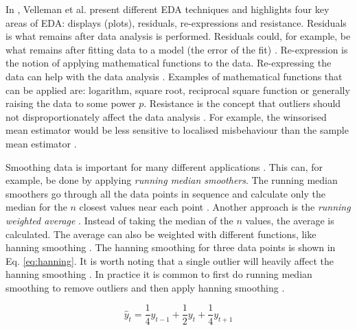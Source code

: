 In \cite{Velleman1981}, Velleman et al. present different EDA techniques and highlights four key areas of EDA: displays (plots), residuals, re-expressions and resistance.
Residuals is what remains after data analysis is performed.
Residuals could, for example, be what remains after fitting data to a model (the error of the fit) \cite{Velleman1981}.
Re-expression is the notion of applying mathematical functions to the data.
Re-expressing the data can help with the data analysis \cite{Hoaglin2003, Velleman1981}.
Examples of mathematical functions that can be applied are: logarithm, square root, reciprocal square function or generally raising the data to some power $p$.
Resistance is the concept that outliers should not disproportionately affect the data analysis \cite{Hoaglin2003, Velleman1981}.
For example, the winsorised mean estimator would be less sensitive to localised misbehaviour than the sample mean estimator \cite{Tukey1977}.

Smoothing data is important for many different applications \cite{Bradley1997, Pang2002, Quinlan1992, Velleman1981}.
This can, for example, be done by applying \emph{running median smoothers}.
The running median smoothers go through all the data points in sequence and calculate only the median for the $n$ closest values near each point \cite{Velleman1981}.
Another approach is the \emph{running weighted average} \cite{Velleman1981}.
Instead of taking the median of the $n$ values, the average is calculated.
The average can also be weighted with different functions, like hanning smoothing \cite{Velleman1981}.
The hanning smoothing for three data points is shown in Eq. \ref{eq:hanning}.
It is worth noting that a single outlier will heavily affect the hanning smoothing \cite{Velleman1981}.
In practice it is common to first do running median smoothing to remove outliers and then apply hanning smoothing \cite{Velleman1981}.

\begin{equation}
  \hat y_t = \frac{1}{4} y_{t-1} + \frac{1}{2} y_t + \frac{1}{4} y_{t + 1} 
  \label{eq:hanning}
\end{equation}


